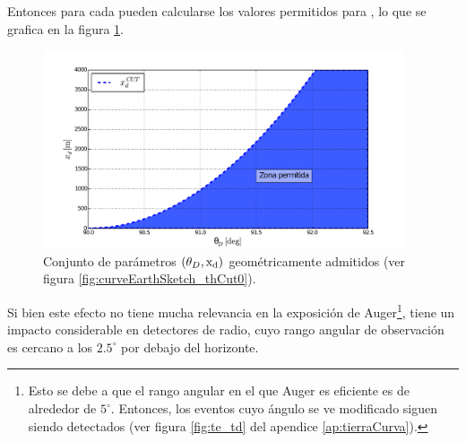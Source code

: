 	Entonces para cada \xd{} pueden calcularse los valores permitidos para \td{}, lo que se grafica en la figura \ref{fig:dx_thcut0}.
	\begin{figure}[ht!]
		\centering
		\includegraphics[width=0.95\textwidth]{./fig/appendix/thetaDCut_mod}
		\caption{\label{fig:dx_thcut0}
		Conjunto de par\'ametros $(\theta_D,{\rm x_d})$ geom\'etricamente admitidos (ver figura \ref{fig:curveEarthSketch_thCut0}).
		}
	\end{figure}
	Si bien este efecto no tiene mucha relevancia en la exposici\'on de Auger\footnote{Esto se debe a que el rango angular en el que Auger es eficiente es de alrededor de $5^\circ$. Entonces, los eventos cuyo \'angulo se ve modificado siguen siendo detectados (ver figura \ref{fig:te_td} del apendice \ref{ap:tierraCurva}).}, tiene un impacto considerable en detectores de radio, cuyo rango angular de observaci\'on es cercano a los $2.5^\circ$ por debajo del horizonte.
	
